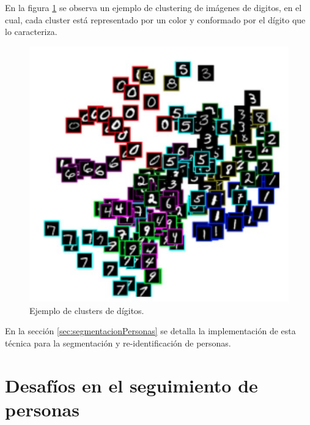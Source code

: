 En la figura \ref{fig:clusterDigitos} se observa un ejemplo de clustering de imágenes de digitos, en el cual, cada cluster está representado por un color y conformado por el dígito que lo caracteriza.

\begin{figure}[ht]
	\centering
	\includegraphics[scale=0.7]{./Figures/clusterDigitos.jpg}
	\caption{Ejemplo de clusters de dígitos\protect\footnotemark.}
	\label{fig:clusterDigitos}
\end{figure}


En la sección \ref{sec:segmentacionPersonas} se detalla la implementación de esta técnica para la segmentación y re-identificación de personas.

\newpage


\section{Desafíos en el seguimiento de personas}
\label{sec:desafiosSeguimiento}

